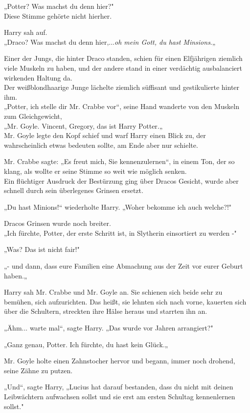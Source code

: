 {„Potter? Was machst du denn hier?"\\ Diese Stimme gehörte nicht hierher.

Harry sah auf.\\ „Draco? Was machst du denn hier,...\emph{oh mein Gott, du hast Minsions}.„

Einer der Jungs, die hinter Draco standen, schien für einen Elfjährigen ziemlich viele Muskeln zu haben, und der andere stand in einer verdächtig ausbalanciert wirkenden Haltung da.\\ Der weißblondhaarige Junge lächelte ziemlich süffisant und gestikulierte hinter ihm.\\ „Potter, ich stelle dir Mr. Crabbe vor“, seine Hand wanderte von den Muskeln zum Gleichgewicht,\\ „Mr. Goyle. Vincent, Gregory, das ist Harry Potter.„\\ Mr. Goyle legte den Kopf schief und warf Harry einen Blick zu, der wahrscheinlich etwas bedeuten sollte, am Ende aber nur schielte.

Mr. Crabbe sagte: „Es freut mich, Sie kennenzulernen“, in einem Ton, der so klang, als wollte er seine Stimme so weit wie möglich senken.\\ Ein flüchtiger Ausdruck der Bestürzung ging über Dracos Gesicht, wurde aber schnell durch sein überlegenes Grinsen ersetzt.

„Du hast Minions!“ wiederholte Harry. „Woher bekomme ich auch welche?!"

Dracos Grinsen wurde noch breiter.\\ „Ich fürchte, Potter, der erste Schritt ist, in Slytherin einsortiert zu werden -"

„Was? Das ist nicht fair!"

„- und dann, dass eure Familien eine Abmachung aus der Zeit vor eurer Geburt haben.„

Harry sah Mr. Crabbe und Mr. Goyle an. Sie schienen sich beide sehr zu bemühen, sich aufzurichten. Das heißt, sie lehnten sich nach vorne, kauerten sich über die Schultern, streckten ihre Hälse heraus und starrten ihn an.

„Ähm... warte mal“, sagte Harry. „Das wurde vor Jahren arrangiert?"

„Ganz genau, Potter. Ich fürchte, du hast kein Glück.„

Mr. Goyle holte einen Zahnstocher hervor und begann, immer noch drohend, seine Zähne zu putzen.

„Und“, sagte Harry, „Lucius hat darauf bestanden, dass du nicht mit deinen Leibwächtern aufwachsen sollst und sie erst am ersten Schultag kennenlernen sollst."

}
